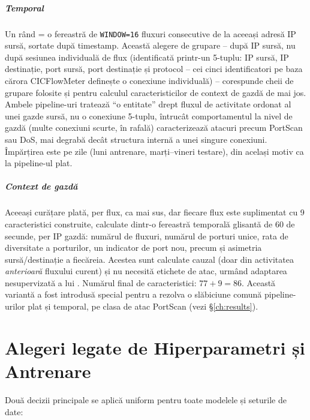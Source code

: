 \paragraph{Temporal} Un rând = o fereastră de \texttt{WINDOW=16} fluxuri consecutive de la aceeași adresă IP sursă, sortate după timestamp.
Această alegere de grupare -- după IP sursă, nu după sesiunea individuală de flux (identificată printr-un 5-tuplu: IP sursă, IP destinație, port sursă, port destinație și protocol -- cei cinci identificatori pe baza cărora CICFlowMeter definește o conexiune individuală) -- corespunde cheii de grupare folosite și pentru calculul caracteristicilor de context de gazdă de mai jos.
Ambele pipeline-uri tratează \enquote{o entitate} drept fluxul de activitate ordonat al unei gazde sursă, nu o conexiune 5-tuplu, întrucât comportamentul la nivel de gazdă (multe conexiuni scurte, în rafală) caracterizează atacuri precum PortScan sau DoS, mai degrabă decât structura internă a unei singure conexiuni. Împărțirea este pe zile (luni antrenare, marți--vineri testare), din același motiv ca la pipeline-ul plat.

\paragraph{Context de gazdă} Aceeași curățare plată, per flux, ca mai sus, dar fiecare flux este suplimentat cu 9 caracteristici construite, calculate dintr-o fereastră temporală glisantă de 60 de secunde, per IP gazdă: numărul de fluxuri, numărul de porturi unice, rata de diversitate a porturilor, un indicator de port nou, precum și asimetria sursă/destinație a fiecăreia. Acestea sunt calculate cauzal (doar din activitatea \emph{anterioară} fluxului curent) și nu necesită etichete de atac, urmând adaptarea nesupervizată a lui \textcite{raskovalov2024nids}. Numărul final de caracteristici: $77 + 9 = 86$. Această variantă a fost introdusă special pentru a rezolva o slăbiciune comună pipeline-urilor plat și temporal, pe clasa de atac PortScan (vezi \S\ref{ch:results}).

\chapter{Alegeri legate de Hiperparametri și Antrenare}
\label{sec:architecture}

Două decizii principale se aplică uniform pentru toate modelele și seturile de date:

